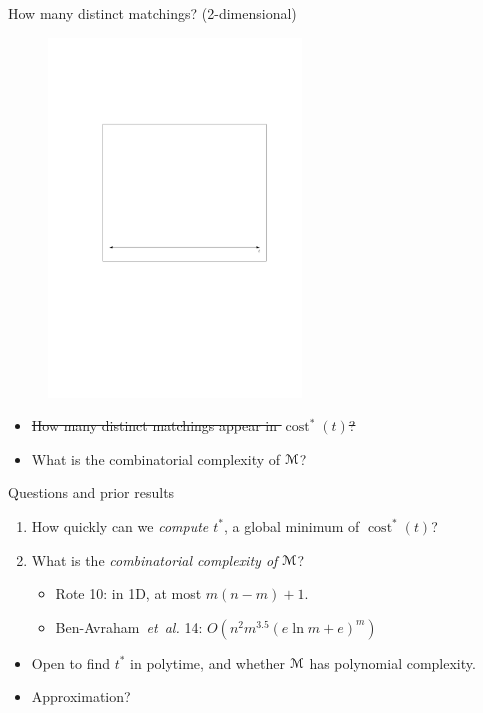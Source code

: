 \documentclass[xcolor={dvipsnames,usenames},handout]{beamer} %
\newcommand{\mycite}[1]{{\color{LimeGreen}\lbrack #1\rbrack}}
\newcommand{\etal}{\textit{et~al.}}
\DeclareMathOperator{\cost}{cost}
\newcommand{\M}{\EuScript{M}}
\def\EMPH#1{\textcolor{BrickRed}{{\emph{#1}}}}
\begin{document}
\begin{frame}{How many distinct matchings? (2-dimensional)}
\begin{figure}
\begin{center}
\includegraphics[width=0.6\textwidth,page=8]{lower_env}%
\end{center}
\end{figure}
\begin{itemize}
\item \sout{How many distinct matchings appear in $\cost^*(t)$?}
\item What is the combinatorial complexity of $\M$?
\end{itemize}
\end{frame}

\begin{frame}{Questions and prior results}
\begin{enumerate}
\item {\large How quickly can we \EMPH{compute $t^*$}, a global minimum of $\cost^*(t)$?}
\item {\large What is the \EMPH{combinatorial complexity of $\M$}?}
	\begin{itemize}
	\item \mycite{Rote 10}: in 1D, at most $m(n-m)+1$.
	\item \mycite{Ben-Avraham~{\etal} 14}: $O(n^2 m^{3.5}(e \ln m + e)^m)$ 
	\end{itemize}
\end{enumerate}
\vspace{20pt}
\begin{itemize}
\pause
\item Open to find $t^*$ in polytime, and whether $\M$ has polynomial complexity.
\pause
\item Approximation?
\end{itemize}
\end{frame}
\end{document}
